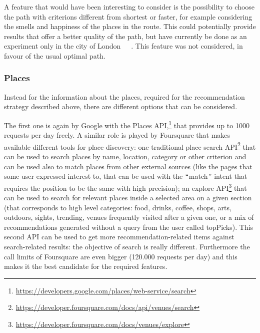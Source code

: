A feature that would have been interesting to consider is the possibility to choose the path with criterions different from shortest or faster, for example considering the smells and happiness of the places in the route. This could potentially provide results that offer a better quality of the path, but have currently be done as an experiment only in the city of London~\cite{quercia2015smelly}~\cite{quercia2016emotional}~\cite{aiello2016chatty}. This feature was not considered, in favour of the usual optimal path.

\subsubsection{Places}
Instead for the information about the places, required for the recommendation strategy described above, there are different options that can be considered.

The first one is again by Google with the Places API,\footnote{\url{https://developers.google.com/places/web-service/search}} that provides up to 1000 requests per day freely. A similar role is played by Foursquare that makes available different tools for place discovery: one traditional place search API\footnote{\url{https://developer.foursquare.com/docs/api/venues/search}} that can be used to search places by name, location, category or other criterion and can be used also to match places from other external sources (like the pages that some user expressed interest to, that can be used with the $``$match$"$  intent that requires the position to be the same with high precision); an explore API\footnote{\url{https://developer.foursquare.com/docs/venues/explore}} that can be used to search for relevant places inside a selected area on a given section (that corresponds to high level categories: food, drinks, coffee, shops, arts, outdoors, sights, trending, venues frequently visited after a given one, or a mix of recommendations generated without a query from the user called topPicks). This second API can be used to get more recommendation-related items against search-related results: the objective of search is really different. Furthermore the call limits of Foursquare are even bigger (120.000 requests per day) and this makes it the best candidate for the required features.

